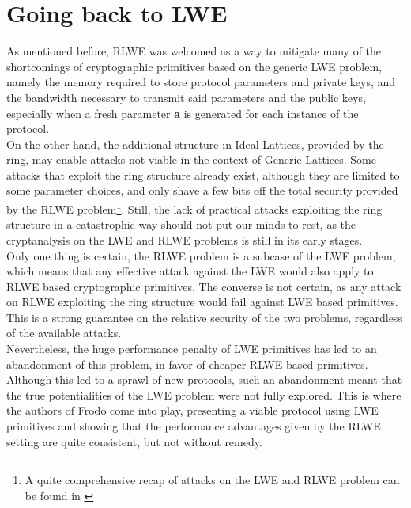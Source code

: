 \section{Going back to LWE}
As mentioned before, RLWE was welcomed as a way to mitigate many of the shortcomings of cryptographic primitives based on the generic LWE problem, namely the memory required to store protocol parameters and private keys, and the bandwidth necessary to transmit said parameters and the public keys, especially when a fresh parameter \textbf{a} is generated for each instance of the protocol.\\
On the other hand, the additional structure in Ideal Lattices, provided by the ring, may enable attacks not viable in the context of Generic Lattices. Some attacks that exploit the ring structure already exist, although they are limited to some parameter choices, and only shave a few bits off the total security provided by the RLWE problem\footnote{A quite comprehensive recap of attacks on the LWE and RLWE problem can be found in \cite{RLWE_attacks}}. Still, the lack of practical attacks exploiting the ring structure in a catastrophic way should not put our minds to rest, as the cryptanalysis on the LWE and RLWE problems is still in its early stages.\\
Only one thing is certain, the RLWE problem is a subcase of the LWE problem, which means that any effective attack against the LWE would also apply to RLWE based cryptographic primitives. The converse is not certain, as any attack on RLWE exploiting the ring structure would fail against LWE based primitives. This is a strong guarantee on the relative security of the two problems, regardless of the available attacks.\\
Nevertheless, the huge performance penalty of LWE primitives has led to an abandonment of this problem, in favor of cheaper RLWE based primitives. Although this led to a sprawl of new protocols, such an abandonment meant that the true potentialities of the LWE problem were not fully explored. This is where the authors of Frodo \cite{frodo} come into play, presenting a viable protocol using LWE primitives and showing that the performance advantages given by the RLWE setting are quite consistent, but not without remedy. 


